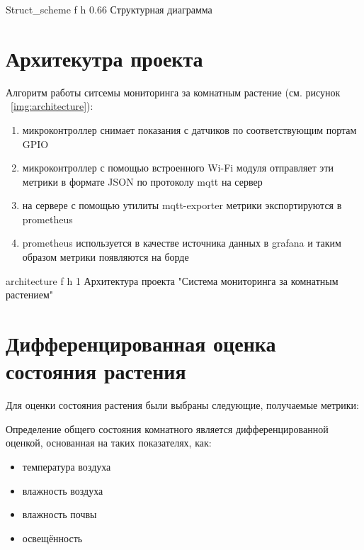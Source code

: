 \documentclass{bmstu}
\begin{document}
    {Struct_scheme} %
    {f} %
    {h} %
    {0.66\textwidth} %
    {Структурная диаграмма} %

    \section{Архитекутра проекта}\label{sec:arch}
    Алгоритм работы ситсемы мониторинга за комнатным растение (см. рисунок ~\ref{img:architecture}):
    \begin{enumerate}
        \item микроконтроллер снимает показания с датчиков по соответствующим портам GPIO
        \item микроконтроллер с помощью встроенного Wi-Fi модуля отправляет эти метрики в формате JSON по протоколу mqtt \cite{MQTTStandardIoT} на сервер
        \item на сервере с помощью утилиты mqtt-exporter \cite{KpetremannMqttexporterSimple} метрики экспортируются в prometheus \cite{OverviewPrometheus}
        \item prometheus используется в качестве источника данных в grafana \cite{GrafanaOSSEnterprise} и таким образом метрики появляются на борде
    \end{enumerate}

    {architecture} %
    {f} %
    {h} %
    {1\textwidth} %
    {Архитектура проекта "Система мониторинга за комнатным растением"} %

    \section{Дифференцированная оценка состояния растения}\label{sec:diff-plant-estimate}
    Для оценки состояния растения были выбраны следующие, получаемые метрики:

    Определение общего состояния комнатного является дифференцированной оценкой,
    основанная на таких показателях, как:
    \begin{itemize}
        \item температура воздуха
        \item влажность воздуха
        \item влажность почвы
        \item освещённость
    \end{itemize}
\end{document}
